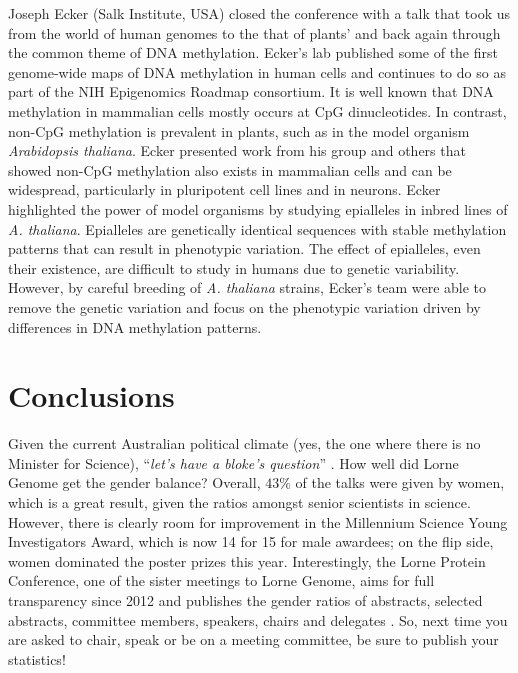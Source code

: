 \documentclass[twocolumn]{bmcart}%
\begin{document}
Joseph Ecker (Salk Institute, USA) closed the conference with a talk that took us from the world of human genomes to the that of plants' and back again through the common theme of DNA methylation. Ecker's lab published some of the first genome-wide maps of DNA methylation in human cells and continues to do so as part of the NIH Epigenomics Roadmap consortium. It is well known that DNA methylation in mammalian cells mostly occurs at CpG dinucleotides.  In contrast, non-CpG methylation is prevalent in plants, such as in the model organism \emph{Arabidopsis thaliana}. Ecker presented work from his group and others that showed non-CpG methylation also exists in mammalian cells and can be widespread, particularly in pluripotent cell lines and in neurons. Ecker highlighted the power of model organisms by studying epialleles in inbred lines of \emph{A. thaliana}. Epialleles are genetically identical sequences with stable methylation patterns that can result in phenotypic variation. The effect of epialleles, even their existence, are difficult to study in humans due to genetic variability. However, by careful breeding of \emph{A. thaliana} strains, Ecker's team were able to remove the genetic variation and focus on the phenotypic variation driven by differences in DNA methylation patterns.

\section*{Conclusions}

Given the current Australian political climate (yes, the one where there is no Minister for Science), ``{\em let's have a bloke's question}'' \cite{INDEPENDENT}.  How well did Lorne Genome get the gender balance?  Overall, $43\%$ of the talks were given by women, which is a great result, given the ratios amongst senior scientists in science.  However, there is clearly room for improvement in the Millennium Science Young Investigators Award, which is now 14 for 15 for male awardees; on the flip side, women dominated the poster prizes this year.  Interestingly, the Lorne Protein Conference, one of the sister meetings to Lorne Genome, aims for full transparency since 2012 and publishes the gender ratios of abstracts, selected abstracts, committee members, speakers, chairs and delegates \cite{LORNEPROTEIN}.  So, next time you are asked to chair, speak or be on a meeting committee, be sure to publish your statistics!

\end{document}
